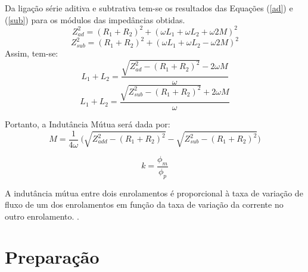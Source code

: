 \documentclass[a4paper,12pt,oneside,openany,table,xcdraw]{article}
\begin{document}
Da ligação série aditiva e subtrativa tem-se os resultados das Equações (\ref{ad}) e (\ref{sub}) para os módulos das impedâncias obtidas.
\begin{equation}\label{ad}
Z_{ad}^2=(R_1+R_2)^2+(\omega L_1+\omega L_2+\omega2M)^2
\end{equation}
\begin{equation}\label{sub}
Z_{sub}^2=(R_1+R_2)^2+(\omega L_1+\omega L_2-\omega2M)^2
\end{equation}
Assim, tem-se:
\begin{equation}
L_1+L_2=\dfrac{\sqrt{Z_{ad}^2-(R_1+R_2)^2}-2\omega M}{\omega}
\end{equation}
\begin{equation}
L_1+L_2=\dfrac{\sqrt{Z_{sub}^2-(R_1+R_2)^2}+2\omega M}{\omega}
\end{equation}
\vspace{0.1cm}

Portanto, a Indutância Mútua será dada por:
\begin{equation}\label{mutua}
M = \dfrac{1}{4\omega}\ \bigg(\sqrt{Z_{add}^2-(R_1+R_2)^2} - \sqrt{Z_{sub}^2-(R_1+R_2)^2}\bigg)
\end{equation}
\vspace{0.1cm}

\begin{equation}\label{k}
k = \dfrac{\phi_m}{\phi_p}
\end{equation}

A indutância mútua entre dois enrolamentos é proporcional à taxa de variação de fluxo de um dos enrolamentos em função da taxa de variação da corrente no outro enrolamento. \cite{boylestad}.

\section{Preparação}
\end{document}
